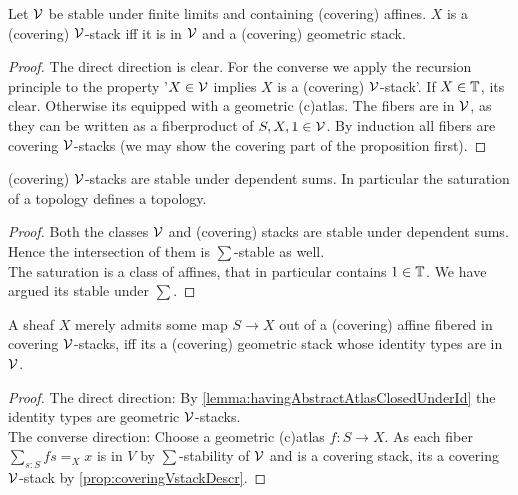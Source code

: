 \begin{prop}{\label{prop:coveringVstackDescr}}
	Let $\mathcal{V}$ be stable under finite limits and containing (covering) affines. $X$ is a (covering) $\mathcal{V}$-stack iff it is in $\mathcal{V}$ and a (covering) geometric stack.
\end{prop}
\begin{proof} 	
	The direct direction is clear. For the converse we apply the recursion principle to the property '$X \in \mathcal{V}$ implies $X$ is a (covering) $\mathcal{V}$-stack'. If $X \in \mathbb{T}$, its clear. Otherwise its equipped with a geometric (c)atlas. The fibers are in $\mathcal{V}$, as they can be written as a fiberproduct of $S, X, 1 \in \mathcal{V}$.  By induction all fibers are covering $\mathcal{V}$-stacks (we may show the covering part of the proposition first). %
\end{proof}
\begin{prop}{\label{prop:CSVSum}}
	(covering) $\mathcal{V}$-stacks are stable under dependent sums. In particular the saturation of a topology defines a topology.
\end{prop}
\begin{proof}
	Both the classes $\mathcal{V}$ and (covering) stacks are stable under dependent sums. Hence the intersection of them is $\sum$-stable as well. \\
	The saturation is a class of affines, that in particular contains $1 \in \mathbb{T}$. We have argued its stable under $\sum$.
\end{proof}
\begin{prop}{\label{prop:V'stacks}}
	A sheaf $X$ merely admits some map $S \to X$ out of a (covering) affine fibered in covering $\mathcal{V}$-stacks, iff its a (covering) geometric stack whose identity types are in $\mathcal{V}$. 
\end{prop}
\begin{proof}
	The direct direction: By \ref{lemma:havingAbstractAtlasClosedUnderId} the identity types are geometric $\mathcal{V}$-stacks. \\
	The converse direction: Choose a geometric (c)atlas $f : S \to X$. As each fiber $\sum_{s : S} f s =_X x$ is in $V$ by $\sum$-stability of $\mathcal{V}$ and is a covering stack, its a covering $\mathcal{V}$-stack by \ref{prop:coveringVstackDescr}.
\end{proof}
